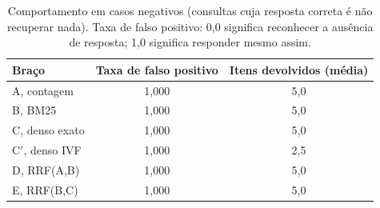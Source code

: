 \begin{table}[htb]
\centering
\caption{Comportamento em casos negativos (consultas cuja resposta correta é não recuperar nada). Taxa de falso positivo: 0{,}0 significa reconhecer a ausência de resposta; 1{,}0 significa responder mesmo assim.}
\label{tab:retrieval-negatives}
\begin{tabular}{lcc}
\toprule
Braço & Taxa de falso positivo & Itens devolvidos (média) \\
\midrule
A, contagem & 1{,}000 & 5{,}0 \\
B, BM25 & 1{,}000 & 5{,}0 \\
C, denso exato & 1{,}000 & 5{,}0 \\
C$'$, denso IVF & 1{,}000 & 2{,}5 \\
D, RRF(A,B) & 1{,}000 & 5{,}0 \\
E, RRF(B,C) & 1{,}000 & 5{,}0 \\
\bottomrule
\end{tabular}
\end{table}
